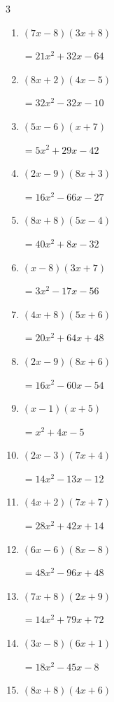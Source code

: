 \begin{multicols}{3}
\begin{enumerate}
        $=64x^{2}-32x+3$

\columnbreak %

  \item $(7x-8)(3x+8)$

        $=21x^{2}+32x-64$

  \item $(8x+2)(4x-5)$

        $=32x^{2}-32x-10$

  \item $(5x-6)(x+7)$

        $=5x^{2}+29x-42$

  \item $(2x-9)(8x+3)$

        $=16x^{2}-66x-27$

  \item $(8x+8)(5x-4)$

        $=40x^{2}+8x-32$

  \item $(x-8)(3x+7)$

        $=3x^{2}-17x-56$

  \item $(4x+8)(5x+6)$

        $=20x^{2}+64x+48$

  \item $(2x-9)(8x+6)$

        $=16x^{2}-60x-54$

  \item $(x-1)(x+5)$

        $=x^{2}+4x-5$

  \item $(2x-3)(7x+4)$

        $=14x^{2}-13x-12$

  \item $(4x+2)(7x+7)$

        $=28x^{2}+42x+14$

  \item $(6x-6)(8x-8)$

        $=48x^{2}-96x+48$

  \item $(7x+8)(2x+9)$

        $=14x^{2}+79x+72$

  \item $(3x-8)(6x+1)$

        $=18x^{2}-45x-8$

  \item $(8x+8)(4x+6)$


\end{enumerate}
\end{multicols}
